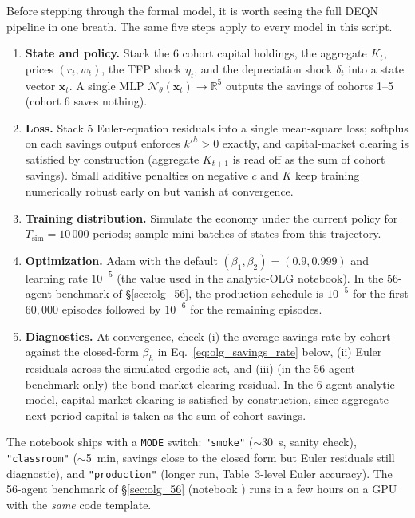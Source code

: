 \documentclass[11pt,a4paper]{report}
\newcommand{\x}{\bm{x}}
\newcommand{\R}{\mathbb{R}}
\begin{document}
\begin{remarkbox}
Before stepping through the formal model, it is worth seeing the full DEQN pipeline in one breath.  The same five steps apply to every model in this script.
\begin{enumerate}[itemsep=2pt, leftmargin=*]
\item \textbf{State and policy.}  Stack the 6 cohort capital holdings, the aggregate $K_t$, prices $(r_t, w_t)$, the TFP shock $\eta_t$, and the depreciation shock $\delta_t$ into a state vector $\x_t$.  A single MLP $\mathcal{N}_\theta(\x_t) \to \R^{5}$ outputs the savings of cohorts 1--5 (cohort 6 saves nothing).
\item \textbf{Loss.}  Stack 5 Euler-equation residuals into a single mean-square loss; softplus on each savings output enforces $k'^h > 0$ exactly, and capital-market clearing is satisfied by construction (aggregate $K_{t+1}$ is read off as the sum of cohort savings).  Small additive penalties on negative $c$ and $K$ keep training numerically robust early on but vanish at convergence.
\item \textbf{Training distribution.}  Simulate the economy under the current policy for $T_{\text{sim}} = 10\,000$ periods; sample mini-batches of states from this trajectory.
\item \textbf{Optimization.}  Adam with the default $(\beta_1,\beta_2)=(0.9,0.999)$ and learning rate $10^{-5}$ (the value used in the analytic-OLG notebook).  In the 56-agent benchmark of \S\ref{sec:olg_56}, the production schedule is $10^{-5}$ for the first $60{,}000$ episodes followed by $10^{-6}$ for the remaining episodes.
\item \textbf{Diagnostics.}  At convergence, check (i) the average savings rate by cohort against the closed-form $\beta_h$ in Eq.~\eqref{eq:olg_savings_rate} below, (ii) Euler residuals across the simulated ergodic set, and (iii) (in the 56-agent benchmark only) the bond-market-clearing residual.  In the 6-agent analytic model, capital-market clearing is satisfied by construction, since aggregate next-period capital is taken as the sum of cohort savings.
\end{enumerate}
The notebook  ships with a \texttt{MODE} switch: \texttt{"smoke"} ($\sim$30~s, sanity check), \texttt{"classroom"} ($\sim$5~min, savings close to the closed form but Euler residuals still diagnostic), and \texttt{"production"} (longer run, Table~3-level Euler accuracy).  The 56-agent benchmark of \S\ref{sec:olg_56} (notebook ) runs in a few hours on a GPU with the \emph{same} code template.
\end{remarkbox}
\end{document}
